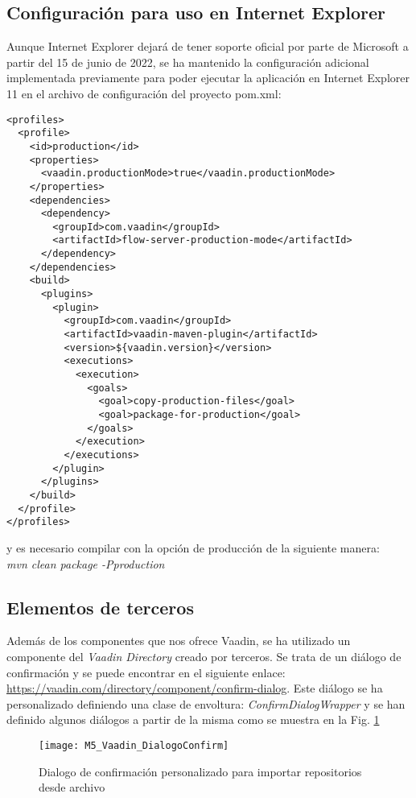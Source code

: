 \newpage
\subsection{Configuración para uso en Internet Explorer}

Aunque Internet Explorer dejará de tener soporte oficial por parte de Microsoft a partir del 15 de junio de 2022, se ha mantenido la configuración adicional implementada previamente para poder ejecutar la aplicación en Internet Explorer 11 en el archivo de configuración del proyecto pom.xml:\\
\begin{minipage}{\linewidth}
{\tiny
\begin{verbatim}
<profiles>
  <profile>
    <id>production</id>
    <properties>
      <vaadin.productionMode>true</vaadin.productionMode>
    </properties>
    <dependencies>
      <dependency>
        <groupId>com.vaadin</groupId>
        <artifactId>flow-server-production-mode</artifactId>
      </dependency>
    </dependencies>
    <build>
      <plugins>
        <plugin>
          <groupId>com.vaadin</groupId>
          <artifactId>vaadin-maven-plugin</artifactId>
          <version>${vaadin.version}</version>
          <executions>
            <execution>
              <goals>
                <goal>copy-production-files</goal>
                <goal>package-for-production</goal>
              </goals>
            </execution>
          </executions>
        </plugin>
      </plugins>
    </build>
  </profile>
</profiles>
\end{verbatim}
}
\end{minipage}

y es necesario compilar con la opción de producción de la siguiente manera:\\

 \textit{mvn clean package -Pproduction}

\newpage
\subsection{Elementos de terceros}

Además de los componentes que nos ofrece Vaadin, se ha utilizado un componente del \textit{Vaadin Directory} creado por terceros. Se trata de un diálogo de confirmación y se puede encontrar en el siguiente enlace: \url{https://vaadin.com/directory/component/confirm-dialog}. Este diálogo se ha personalizado definiendo una clase de envoltura: \textit{ConfirmDialogWrapper} y se han definido algunos diálogos a partir de la misma como se muestra en la Fig. \ref{fig:M5_Vaadin_DialogoConfirm}

\begin{figure}[!h]
	\centering
	\texttt{[image: M5\_Vaadin\_DialogoConfirm]}
	\caption{Dialogo de confirmación personalizado para importar repositorios desde archivo}\label{fig:M5_Vaadin_DialogoConfirm}
\end{figure}

